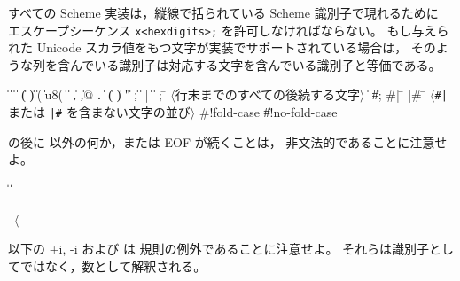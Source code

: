 すべての Scheme 実装は，縦線で括られている Scheme 識別子で現れるために
エスケープシーケンス {\tt \backwhack{}x<hexdigits>;} を許可しなければならない。
もし与えられた Unicode スカラ値をもつ文字が実装でサポートされている場合は，
そのような列を含んでいる識別子は対応する文字を含んでいる識別子と等価である。

\begin{grammar}%
 \:  \|  \| 
\>  \|  \| 
\>  \| ( \| ) \| \sharpsign( \| \sharpsign u8( \| \singlequote{} \| \backquote{} \| , \| ,@ \| {\bf.}
 \:  \| 
\> \| ( \| ) \| " \| ;
 \: 
 \:  \| 
 \: |
 \:  \|  
\> \| 
 \: ; \= $\langle$\rm 行末までのすべての後続する文字$\rangle$
\> \| 
\> \| \#;  
 \: \#| \= 
\>  |\#
 \: \= $\langle$\rm {\tt \#|} または {\tt |\#} を含まない文字の並び$\rangle$
 \:  
 \: \#!fold-case \| \#!no-fold-case%
\end{grammar}

 の後に  以外の何か，または EOF が続くことは，
非文法的であることに注意せよ。

\begin{grammar}%
 \:  \|  \| 
 \: %
\end{grammar}

\label{extendedalphas}
\label{identifiersyntax}

\hbox{\cf{} \goesto{} $\langle$}

以下の {\cf +i}, {\cf -i} および  は
 規則の例外であることに注意せよ。
それらは識別子としてではなく，数として解釈される。

